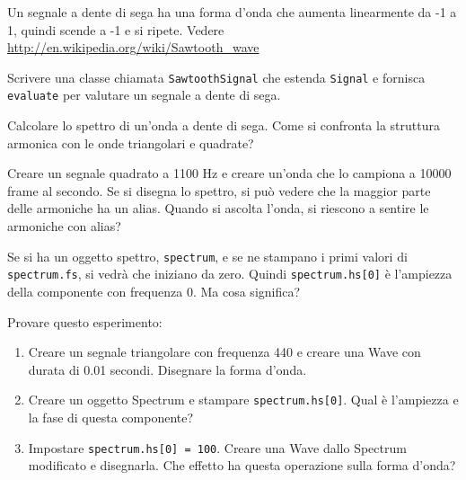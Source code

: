 \documentclass[12pt,a4paper]{book}
\begin{document}
\begin{exercise} Un segnale a dente di sega ha una forma d'onda che aumenta linearmente da -1 a 1, quindi scende a -1 e si ripete. Vedere \url{http://en.wikipedia.org/wiki/Sawtooth_wave}

Scrivere una classe chiamata {\tt SawtoothSignal} che estenda {\tt Signal} e fornisca {\tt evaluate} per valutare un segnale a dente di sega.

Calcolare lo spettro di un'onda a dente di sega. Come si confronta la struttura armonica con le onde triangolari e quadrate? \end{exercise} 

\begin{exercise} Creare un segnale quadrato a 1100 Hz e creare un'onda che lo campiona a 10000 frame al secondo. Se si disegna lo spettro, si può vedere che la maggior parte delle armoniche ha un alias. Quando si ascolta l'onda, si riescono a sentire le armoniche con alias? \end{exercise} 

\begin{exercise} Se si ha un oggetto spettro, {\tt spectrum}, e se ne stampano i primi valori di {\tt spectrum.fs}, si vedrà che iniziano da zero. Quindi {\tt spectrum.hs[0]} è l'ampiezza della componente con frequenza 0. Ma cosa significa?

Provare questo esperimento:

\begin{enumerate} 

\item Creare un segnale triangolare con frequenza 440 e creare una Wave con durata di 0.01 secondi. Disegnare la forma d'onda.

\item Creare un oggetto Spectrum e stampare {\tt spectrum.hs[0]}. Qual è l'ampiezza e la fase di questa componente?

\item Impostare {\tt spectrum.hs[0] = 100}. Creare una Wave dallo Spectrum modificato e disegnarla. Che effetto ha questa operazione sulla forma d'onda?

\end{enumerate} 

\end{exercise} 
\end{document}
